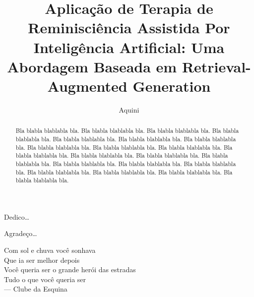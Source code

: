 \documentclass[diss,capa]{texufpel}
\title{Aplicação de Terapia de Reminisciência Assistida Por Inteligência
Artificial: Uma Abordagem Baseada em Retrieval-Augmented Generation}
\author{Aquini}{Lui Gill}
\begin{document}

\maketitle 

\sloppy

\fichacatalografica





\begin{dedicatoria}
  Dedico\ldots 
\end{dedicatoria}

\begin{agradecimentos}
  Agradeço\ldots 
\end{agradecimentos}

\begin{epigrafe}
  Com sol e chuva você sonhava\\
  Que ia ser melhor depois\\
  Você queria ser o grande herói das estradas\\
  Tudo o que você queria ser\\
  {\sc --- Clube da Esquina}
\end{epigrafe}

\begin{abstract}
Bla blabla blablabla bla.  Bla blabla blablabla bla.  Bla blabla
blablabla bla.  Bla blabla blablabla bla.  Bla blabla blablabla bla.
Bla blabla blablabla bla.  Bla blabla blablabla bla.  Bla blabla
blablabla bla.  Bla blabla blablabla bla.  Bla blabla blablabla bla.
Bla blabla blablabla bla.  Bla blabla blablabla bla.  Bla blabla
blablabla bla.  Bla blabla blablabla bla.  Bla blabla blablabla bla.
Bla blabla blablabla bla.  Bla blabla blablabla bla.  Bla blabla
blablabla bla.  Bla blabla blablabla bla.  Bla blabla blablabla bla.
Bla blabla blablabla bla.
\end{abstract}
\end{document}
